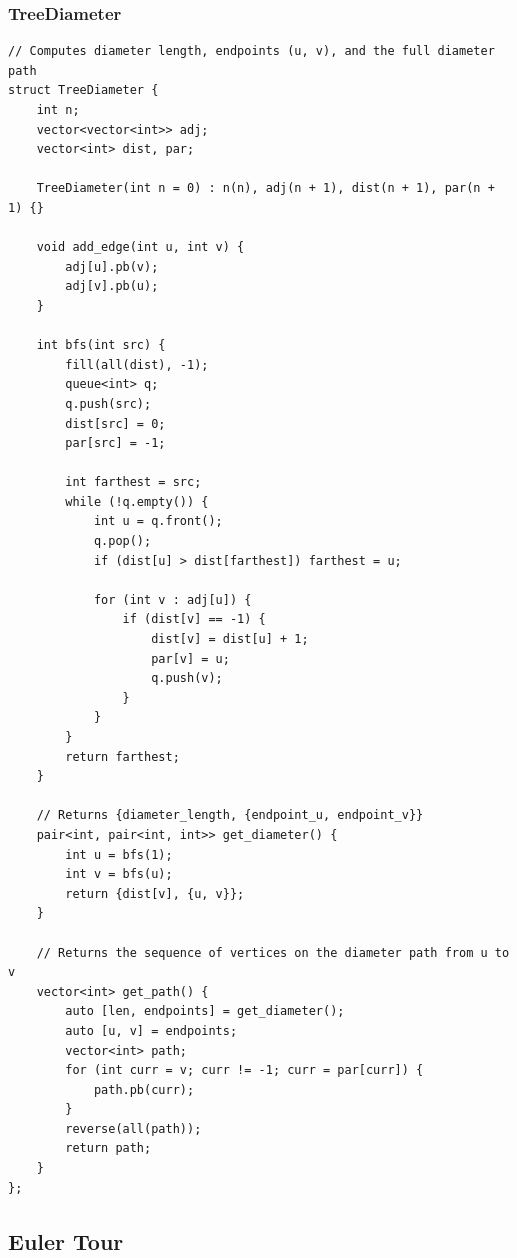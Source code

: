 \documentclass[9pt,a4paper,twocolumn]{extarticle}
\begin{document}
\subsubsection{TreeDiameter}
\nopagebreak
\begin{lstlisting}
// Computes diameter length, endpoints (u, v), and the full diameter path
struct TreeDiameter {
    int n;
    vector<vector<int>> adj;
    vector<int> dist, par;

    TreeDiameter(int n = 0) : n(n), adj(n + 1), dist(n + 1), par(n + 1) {}

    void add_edge(int u, int v) {
        adj[u].pb(v);
        adj[v].pb(u);
    }

    int bfs(int src) {
        fill(all(dist), -1);
        queue<int> q;
        q.push(src);
        dist[src] = 0;
        par[src] = -1;

        int farthest = src;
        while (!q.empty()) {
            int u = q.front();
            q.pop();
            if (dist[u] > dist[farthest]) farthest = u;

            for (int v : adj[u]) {
                if (dist[v] == -1) {
                    dist[v] = dist[u] + 1;
                    par[v] = u;
                    q.push(v);
                }
            }
        }
        return farthest;
    }

    // Returns {diameter_length, {endpoint_u, endpoint_v}}
    pair<int, pair<int, int>> get_diameter() {
        int u = bfs(1);
        int v = bfs(u);
        return {dist[v], {u, v}};
    }

    // Returns the sequence of vertices on the diameter path from u to v
    vector<int> get_path() {
        auto [len, endpoints] = get_diameter();
        auto [u, v] = endpoints;
        vector<int> path;
        for (int curr = v; curr != -1; curr = par[curr]) {
            path.pb(curr);
        }
        reverse(all(path));
        return path;
    }
};
\end{lstlisting}

\subsection{Euler Tour}

\filbreak
\end{document}
